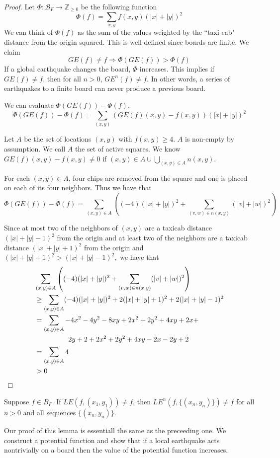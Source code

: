 \documentclass[runningheads,a4paper]{llncs}
\begin{document}
\begin{proof}
Let $\Phi: \mathcal{B}_F \rightarrow \mathbb{Z}_{\geq 0}$ be the following function
\[ \Phi(f) = \sum_{x,y} f(x,y)(|x|+|y|)^2 \]
We can think of $\Phi(f)$ as the sum of the values weighted by the ``taxi-cab" distance from the origin squared. This is well-defined since boards are finite. We claim
\[ GE(f) \neq f \Rightarrow \Phi(GE(f)) > \Phi(f) \]
If a global earthquake changes the board, $\Phi$ increases. This implies if $GE(f) \neq f$, then for all $n > 0$, $GE^n(f) \neq f$. In other words, a series of earthquakes to a finite board can never produce a previous board.

We can evaluate $\Phi(GE(f)) - \Phi(f),$ 
\[ \Phi(GE(f)) - \Phi(f) = \sum_{ (x,y)} (GE(f)(x,y) -f(x,y))(|x|+|y|)^2 \]

Let $A$ be the set of locations $(x,y)$ with $f(x,y) \geq 4$. $A$ is non-empty by assumption. We call $A$ the set of active squares. We know $GE(f)(x,y) -f(x,y) \neq 0$ if $(x,y) \in A \cup \bigcup_{(x,y) \in A} n(x,y)$.

For each $(x,y) \in A$, four chips are removed from the square and one is placed on each of its four neighbors. Thus we have that 
\[ \Phi(GE(f)) - \Phi(f)= \sum_{(x,y) \in A} \left((-4)(|x|+|y|)^2 + \sum_{(v,w) \in n(x,y)} (|v| + |w|)^2 \right) \]

Since at most two of the neighbors of $(x,y)$ are a taxicab distance $(|x|+|y|-1)^2$ from the origin and at least two of the neighbors are a taxicab distance $(|x|+|y|+1)^2$ from the origin and $(|x|+|y|+1)^2 > (|x|+|y|-1)^2,$ we have that 
\begin{align*}
& \sum_{(x,y) \in A} \left((-4)(|x|+|y|)^2 + \sum_{(v,w) \in n(x,y)} (|v| + |w|)^2 \right) \\
&\geq \sum_{(x,y) \in A} (-4)(|x|+|y|)^2+ 2(|x|+|y|+1)^2 + 2(|x|+|y|-1)^2 \\
&= \sum_{(x,y) \in A} -4x^2 -4y^2 -8xy +2x^2 +2y^2 +4xy +2x + \\
&\hspace{1.7cm} 2y + 2+2x^2 +2y^2 +4xy -2x -2y +2\\
&= \sum_{(x,y) \in A} 4\\
&> 0
\end{align*}
\end{proof}

\begin{lemma}
Suppose $f \in B_F$. If $LE(f, (x_1, y_1)) \neq f$, then $LE^n(f, \{(x_n,y_n)\}) \neq f$ for all $n > 0$ and all sequences $\{(x_n, y_n)\}$.
\end{lemma}
Our proof of this lemma is essentiall the same as the preceeding one. We construct a potential function and show that if a local earthquake acts nontrivially on a board then the value of the potential function increases. 
\end{document}
